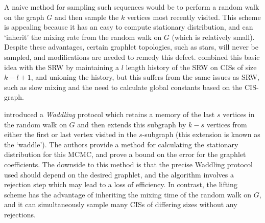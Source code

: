 A naive method for sampling such sequences would be to perform a random walk on the graph $G$ and then sample the $k$ vertices most recently visited.
This scheme is appealing because it has an easy to compute stationary distribution, and can `inherit' the mixing rate from the random walk on $G$ (which is relatively small).
Despite these advantages, certain graphlet topologies, such as stars, will never be sampled, and modifications are needed to remedy this defect.
\cite{chen2016general} combined this basic idea with the SRW by maintaining a $l$ length history of the SRW on CISs of size $k-l+1$, and unioning the history, but this suffers from the same issues as SRW, such as slow mixing and the need to calculate global constants based on the CIS-graph.

\cite{Han2016waddling} introduced a {\em Waddling} protocol which retains a memory of the last $s$ vertices in the random walk on $G$ and then extends this subgraph by $k-s$ vertices from either the first or last vertex visited in the $s$-subgraph (this extension is known as the `waddle').
The authors provide a method for calculating the stationary distribution for this MCMC, and prove a bound on the error for the graphlet coefficients.
The downside to this method is that the precise Waddling protocol used should depend on the desired graphlet, and the algorithm involves a rejection step which may lead to a loss of efficiency.
In contrast, the lifting scheme has the advantage of inheriting the mixing time of the random walk on $G$, and it can simultaneously sample many CISs of differing sizes without any rejections.



	
	
